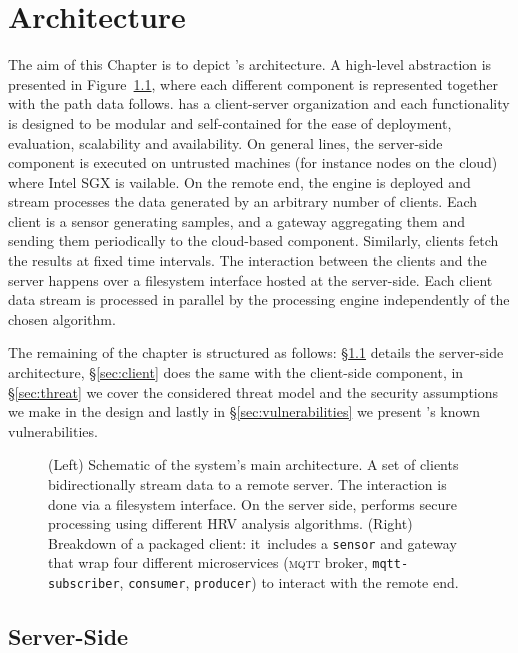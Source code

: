 \chapter{Architecture} \label{chap:architecture}

The aim of this Chapter is to depict \projName's architecture.
A high-level abstraction is presented in Figure~\ref{fig:system-architecture}, where each different component is represented together with the path data follows.
\projName has a client-server organization and each functionality is designed to be modular and self-contained for the ease of deployment, evaluation, scalability and availability.
On general lines, the server-side component is executed on untrusted machines (for instance nodes on the cloud) where Intel SGX is vailable.
On the remote end, the \sgxspark engine is deployed and stream processes the data generated by an arbitrary number of clients.
Each client is a sensor generating samples, and a gateway aggregating them and sending them periodically to the cloud-based component.
Similarly, clients fetch the results at fixed time intervals.
The interaction between the clients and the server happens over a filesystem interface hosted at the server-side.
Each client data stream is processed in parallel by the processing engine independently of the chosen algorithm.

The remaining of the chapter is structured as follows: \S\ref{sec:server} details the server-side architecture, \S\ref{sec:client} does the same with the client-side component, in \S\ref{sec:threat} we cover the considered threat model and the security assumptions we make in the design and lastly in \S\ref{sec:vulnerabilities} we present \projName's known vulnerabilities.

\begin{figure}[h!]
    \centering
    
    \caption{(Left) Schematic of the system's main architecture. A set of clients bidirectionally stream data to a remote server. The interaction is done via a filesystem interface. On the server side, \sgxspark performs secure processing using different HRV analysis algorithms. (Right) Breakdown of a packaged client: it includes a \texttt{sensor} and gateway that wrap four different microservices (\textsc{mqtt} broker, \texttt{mqtt-subscriber}, \texttt{consumer}, \texttt{producer}) to interact with the remote end. \label{fig:system-architecture}}
\end{figure}

\section{Server-Side} \label{sec:server}

